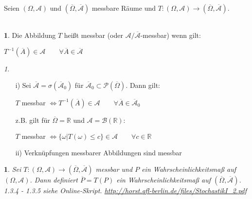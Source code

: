 \documentclass[10pt,a4paper]{report}
\numberwithin{equation}{section}
\numberwithin{figure}{section}
\theoremstyle{plain}
\theoremstyle{definition}
\newtheorem{defn}[thm]{\protect\definitionname}
\theoremstyle{remark}
\newtheorem{rem}[thm]{\protect\remarkname}
\theoremstyle{plain}
\newtheorem{prop}[thm]{\protect\propositionname}
\providecommand{\definitionname}{Definition}
\providecommand{\propositionname}{Satz}
\providecommand{\remarkname}{Bemerkung}
\newcommand{\1}{ \mathbb{1} } %
\begin{document}
Seien $(\Omega, \mathcal{A})$ und $(\overline{\Omega},\overline{\mathcal{A}})$ messbare Räume und $T: (\Omega, \mathcal{A}) \to (\overline{\Omega},\overline{\mathcal{A}})$.\\\\
\begin{defn}  %
  Die Abbildung $T$ heißt messbar  (oder
  $\mathcal{A}/\overline{\mathcal{A}}$-messbar) wenn gilt:
  \begin{center}
    $T^{-1}(\overline{A}) \in \mathcal{A} \qquad \forall \overline{A}
    \in \overline{\mathcal{A}}$
  \end{center}
\end{defn}
\begin{rem} \
  \begin{itemize}
  \item[i)] Sei
    $\overline{\mathcal{A}}=\sigma(\overline{\mathcal{A}}_0)$ für
    $\overline{\mathcal{A}}_0 \subset
    \mathcal{P}(\overline{\Omega})$. Dann gilt:
    \begin{center}
      $T$ messbar $\Leftrightarrow T^{-1}(\overline{A}) \in
      \mathcal{A} \qquad \forall \overline{A} \in
      \overline{\mathcal{A}}_0$
    \end{center}
    z.B. gilt für $\overline{\Omega}=\mathbb{R}$ und
    $\mathcal{A}=\mathcal{B}(\mathbb{R})$:
    \begin{center}
      $T$ messbar $\Leftrightarrow \{\omega|T(\omega)\leq c\} \in
      \mathcal{A} \qquad \forall c \in \mathbb{R}$
    \end{center}
  \item[ii)] Verknüpfungen messbarer Abbildungen sind messbar
  \end{itemize}
\end{rem}
\begin{prop} %
  Sei $T:(\Omega, \mathcal{A})\to(\overline{\Omega},\overline{\mathcal{A}})$ messbar und $P$ ein Wahrscheinlichkeitsmaß auf $(\Omega, \mathcal{A})$. Dann definiert $\overline{P}=T(P)$ ein Wahrscheinlichkeitsmaß auf $(\overline{\Omega},\overline{\mathcal{A}})$.\\
  1.3.4 - 1.3.5 siehe Online-Skript. \url{http://horst.qfl-berlin.de/files/StochastikI_2.pdf}
\end{prop}
\end{document}
